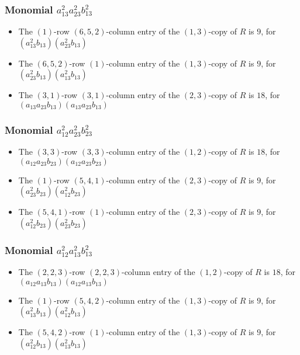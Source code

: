 \documentclass{article}
\begin{document}
\subsubsection{Monomial $ a_{13}^{2} a_{23}^{2} b_{13}^{2} $}

\begin{itemize}
\item The $(1)$-row $(6, 5, 2)$-column entry of the $ \left(1, 3\right) $-copy of $R$ is $ 9 $, for $( a_{13}^{2} b_{13} )( a_{23}^{2} b_{13} )$ 
\item The $(6, 5, 2)$-row $(1)$-column entry of the $ \left(1, 3\right) $-copy of $R$ is $ 9 $, for $( a_{23}^{2} b_{13} )( a_{13}^{2} b_{13} )$ 
\item The $(3, 1)$-row $(3, 1)$-column entry of the $ \left(2, 3\right) $-copy of $R$ is $ 18 $, for $( a_{13} a_{23} b_{13} )( a_{13} a_{23} b_{13} )$ 
\end{itemize}
\subsubsection{Monomial $ a_{12}^{2} a_{23}^{2} b_{23}^{2} $}

\begin{itemize}
\item The $(3, 3)$-row $(3, 3)$-column entry of the $ \left(1, 2\right) $-copy of $R$ is $ 18 $, for $( a_{12} a_{23} b_{23} )( a_{12} a_{23} b_{23} )$ 
\item The $(1)$-row $(5, 4, 1)$-column entry of the $ \left(2, 3\right) $-copy of $R$ is $ 9 $, for $( a_{23}^{2} b_{23} )( a_{12}^{2} b_{23} )$ 
\item The $(5, 4, 1)$-row $(1)$-column entry of the $ \left(2, 3\right) $-copy of $R$ is $ 9 $, for $( a_{12}^{2} b_{23} )( a_{23}^{2} b_{23} )$ 
\end{itemize}
\subsubsection{Monomial $ a_{12}^{2} a_{13}^{2} b_{13}^{2} $}

\begin{itemize}
\item The $(2, 2, 3)$-row $(2, 2, 3)$-column entry of the $ \left(1, 2\right) $-copy of $R$ is $ 18 $, for $( a_{12} a_{13} b_{13} )( a_{12} a_{13} b_{13} )$ 
\item The $(1)$-row $(5, 4, 2)$-column entry of the $ \left(1, 3\right) $-copy of $R$ is $ 9 $, for $( a_{13}^{2} b_{13} )( a_{12}^{2} b_{13} )$ 
\item The $(5, 4, 2)$-row $(1)$-column entry of the $ \left(1, 3\right) $-copy of $R$ is $ 9 $, for $( a_{12}^{2} b_{13} )( a_{13}^{2} b_{13} )$ 
\end{itemize}
\end{document}
